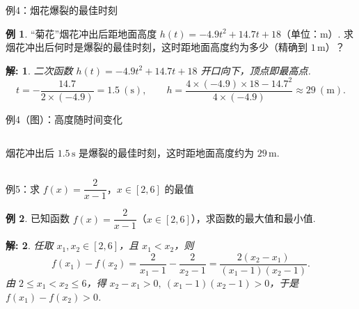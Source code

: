 \documentclass[aspectratio=169,13pt,t] {beamer}
\newtheorem*{solve}{解:}
\theoremstyle{definition}
\newtheorem{exam}{例}
\begin{document}
\begin{frame}{例4：烟花爆裂的最佳时刻}
	\begin{exam}
	“菊花”烟花冲出后距地面高度 \(h(t)=-4.9t^2+14.7t+18\)（单位：m）. 求烟花冲出后何时是爆裂的最佳时刻，这时距地面高度约为多少（精确到 \(1\,\mathrm{m}\)）？
	\end{exam}
	\pause
	\begin{solve}
	二次函数 \(h(t)=-4.9t^2+14.7t+18\) 开口向下，顶点即最高点.
	\[
		t=-\frac{14.7}{2\times(-4.9)}=1.5\ (\mathrm{s}),\qquad
		h=\frac{4\times(-4.9)\times18-14.7^2}{4\times(-4.9)}\approx 29\ (\mathrm{m}).
	\]
	\end{solve}
\end{frame}

\begin{frame}{例4（图）：高度随时间变化}
	\begin{columns}
		\vspace{2em}
		\begin{summarybox-answer}
		烟花冲出后 \(1.5\,\mathrm{s}\) 是爆裂的最佳时刻，这时距地面高度约为 \(29\,\mathrm{m}\).
		\end{summarybox-answer}
	\end{columns}
\end{frame}

\begin{frame}{例5：求 \(f(x)=\dfrac{2}{x-1}\)，\(x\in[2,6]\) 的最值}
	\begin{exam}
	已知函数 \(f(x)=\dfrac{2}{x-1}\)（\(x\in[2,6]\)），求函数的最大值和最小值.
	\end{exam}
	\pause
	\begin{solve}
	任取 \(x_1,x_2\in[2,6]\)，且 \(x_1<x_2\)，则
	\[
		f(x_1)-f(x_2)=\frac{2}{x_1-1}-\frac{2}{x_2-1}
		=\frac{2(x_2-x_1)}{(x_1-1)(x_2-1)}.
	\]
	由 \(2\leqslant x_1<x_2\leqslant6\)，得 \(x_2-x_1>0,\ (x_1-1)(x_2-1)>0\)，于是 \(f(x_1)-f(x_2)>0\).
	\end{solve}
\end{frame}
\end{document}
